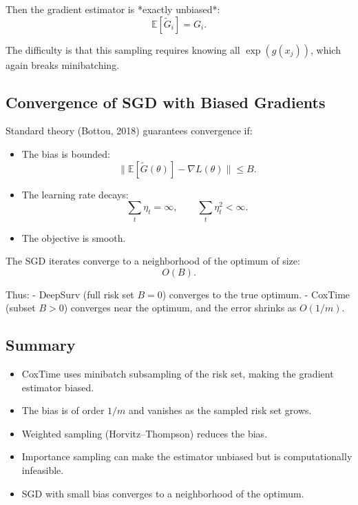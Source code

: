 \documentclass{article}
\begin{document}
Then the gradient estimator is *exactly unbiased*:
\[
\mathbb{E}[\widetilde{G}_i]=G_i.
\]

The difficulty is that this sampling requires knowing all $\exp(g(x_j))$, which again breaks minibatching.

\subsection{Convergence of SGD with Biased Gradients}

Standard theory (Bottou, 2018) guarantees convergence if:

\begin{itemize}
\item The bias is bounded:
\[
\|\mathbb{E}[\widetilde{G}(\theta)] - \nabla L(\theta)\|
\le B.
\]
\item The learning rate decays:
\[
\sum_t \eta_t = \infty,\qquad \sum_t \eta_t^2 < \infty.
\]
\item The objective is smooth.
\end{itemize}

The SGD iterates converge to a neighborhood of the optimum of size:
\[
O(B).
\]

Thus:
- DeepSurv (full risk set $B=0$) converges to the true optimum.
- CoxTime (subset $B>0$) converges near the optimum, and the error shrinks as $O(1/m)$.

\subsection{Summary}

\begin{itemize}
\item CoxTime uses minibatch subsampling of the risk set, making the gradient estimator biased.
\item The bias is of order $1/m$ and vanishes as the sampled risk set grows.
\item Weighted sampling (Horvitz--Thompson) reduces the bias.
\item Importance sampling can make the estimator unbiased but is computationally infeasible.
\item SGD with small bias converges to a neighborhood of the optimum.
\end{itemize}
\end{document}

